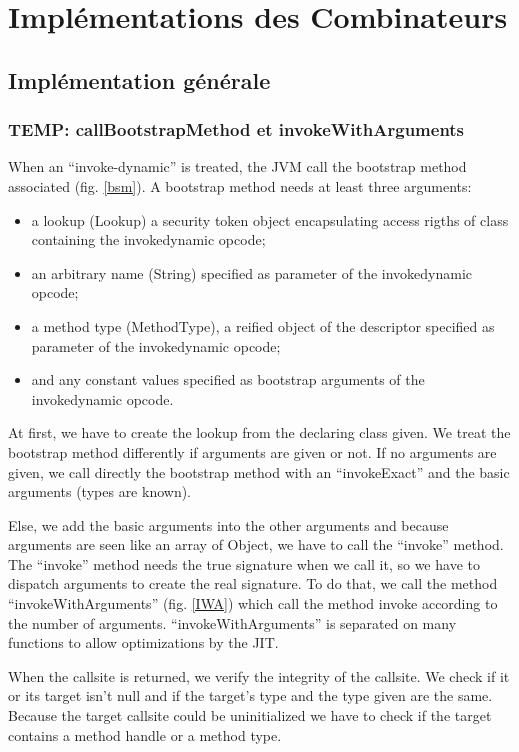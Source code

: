 \documentclass{sigplanconf}
\def \JVM{JVM\xspace}
\begin{document}
\section{Impl\'ementations des Combinateurs}

  \subsection{Impl\'ementation g\'en\'erale}

    \subsubsection{TEMP: callBootstrapMethod et invokeWithArguments}
    When an ``invoke-dynamic'' is treated, the \JVM call the bootstrap method associated (fig. \ref{bsm}).
    A bootstrap method needs at least three arguments:
    \begin{itemize}
      \item a lookup (Lookup) a security token object encapsulating access rigths of class containing the invokedynamic opcode;
      \item an arbitrary name (String) specified as parameter of the invokedynamic opcode;
      \item a method type (MethodType), a reified object of the descriptor specified as parameter of the invokedynamic opcode;
      \item and any constant values specified as bootstrap arguments of the invokedynamic opcode.
    \end{itemize}

    At first, we have to create the lookup from the declaring class given.
    We treat the bootstrap method differently if arguments are given or not.
    If no arguments are given, we call directly the bootstrap method
    with an ``invokeExact'' and the basic arguments (types are known).

    Else, we add the basic arguments into the other arguments
    and because arguments are seen like an array of Object,
    we have to call the ``invoke'' method.
    The ``invoke'' method needs the true signature when we call it,
    so we have to dispatch arguments to create the real signature.
    To do that, we call the method ``invokeWithArguments'' (fig. \ref{IWA})
    which call the method invoke according to the number of arguments.
    ``invokeWithArguments'' is separated on many functions to allow optimizations by the JIT.

    When the callsite is returned, we verify the integrity of the callsite.
    We check if it or its target isn't null and if the target's type and the type given are the same.
    Because the target callsite could be uninitialized we have to check if the target contains a method handle or a method type.
\end{document}
